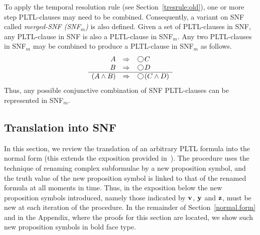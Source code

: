 \documentclass[nohyperref]{acmtrans2f}
\newcommand{\next}{\!\raisebox{-.2ex}{ %
                        \mbox{\unitlength=0.9ex
                        \begin{picture}(2,2)
                        \linethickness{0.06ex}
                        \put(1,1){\circle{2}} %
                        \end{picture}}}       %
                        \,}
\begin{document}
To apply the temporal resolution rule (see Section~\ref{tresrule:old}), one
or more step PLTL-clauses may need to be combined. Consequently, a variant on
SNF called {\em merged-SNF (SNF$_m$)} \cite{Fis90-resolve} is also defined.
Given a set of PLTL-clauses in SNF, any PLTL-clause in SNF is also a
PLTL-clause in SNF$_{m}$. Any two PLTL-clauses in SNF$_{m}$
may be combined to produce a PLTL-clause in SNF$_{m}$ as follows. 
%
$$
\begin{array}{rcl}
	      A & \Rightarrow & \next C \\
	      B & \Rightarrow & \next D \\ \hline
	       (A \land B) & \Rightarrow & \next (C \land D )
\end{array}
$$
%
Thus, any possible conjunctive combination of SNF PLTL-clauses
can be represented in SNF$_m$.
%
\subsection{Translation into SNF}
\label{tran.to.snf}
%
In this section, we review the translation of an arbitrary PLTL formula
into the normal form (this extends the exposition provided
in~). The procedure uses the technique of renaming 
complex subformulae by a new proposition symbol, and the truth value of the new
proposition symbol is linked to that of the renamed formula at all moments in time.
Thus, in the exposition below the new proposition symbols introduced, namely those
indicated by ${\bf v}$, ${\bf y}$ and ${\bf z}$, must be new at each iteration of
the procedure. In the remainder of Section~\ref{normal.form} and in
the Appendix, where the proofs for this section are located,
we show such  new proposition symbols in bold face type. 
\end{document}
